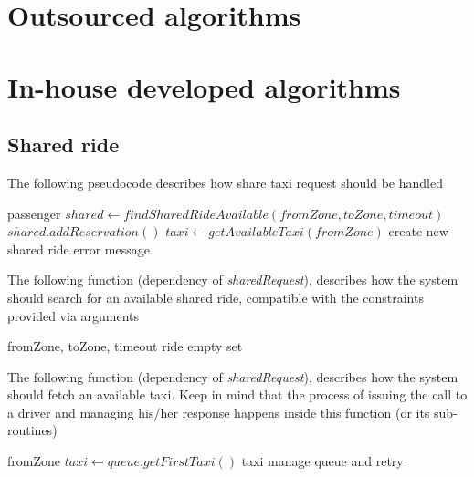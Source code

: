 \section{Outsourced algorithms}

\section{In-house developed algorithms}
\subsection{Shared ride}
The following pseudocode describes how share taxi request should be handled
\begin{algorithmic}
  {passenger}
  \State $ shared \gets findSharedRideAvailable(fromZone, toZone, timeout) $
    \State $ shared.addReservation() $
  \Else
    \State $ taxi \gets getAvailableTaxi(fromZone) $
      \State create new shared ride
    \Else
      \State error message
    \EndIf
  \EndIf
 \EndFunction
\end{algorithmic}
\vspace{5mm}

The following function (dependency of \textit{sharedRequest}), describes how the system should search for an
available shared ride, compatible with the constraints provided via arguments
\begin{algorithmic}
  {fromZone, toZone, timeout}
	    \State \Return ride
	  \EndIf
	\EndIf
      \EndIf
    \EndIf
  \EndFor
  \State \Return empty set
 \EndFunction
\end{algorithmic}
\vspace{5mm}

The following function (dependency of \textit{sharedRequest}), describes how the system should fetch an available taxi.
Keep in mind that the process of issuing the call to a driver and managing his/her response happens inside this function
(or its sub-routines)
\begin{algorithmic}
 {fromZone}
       \State $ taxi \gets queue.getFirstTaxi() $
         \Return taxi
     \Else 
         \State manage queue and retry
    \EndIf
\EndIf
\EndFor
\EndFunction


\end{algorithmic}

